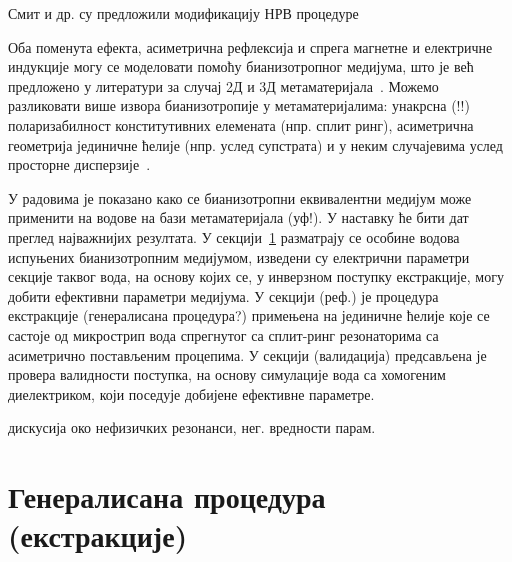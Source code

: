 Смит и др. су предложили модификацију НРВ процедуре~\cite{smith:05}

Оба поменута ефекта, асиметрична рефлексија и спрега магнетне и електричне индукције могу се моделовати помоћу бианизотропног медијума, што је већ предложено у литератури за случај 2Д и 3Д метаматеријала~\cite{chen:05,kriegler,shalaev}. Можемо разликовати више извора бианизотропије у метаматеријалима: унакрсна (!!) поларизабилност конститутивних елемената (нпр. сплит ринг), асиметрична геометрија јединичне ћелије (нпр. услед супстрата) и у неким случајевима услед просторне дисперзије~\cite{alu2}.

У радовима \cite{bian_mtt,bian_physcr} је показано како се бианизотропни еквивалентни медијум може применити на водове на бази метаматеријала (уф!). У наставку ће бити дат преглед најважнијих резултата. У секцији~\ref{sekc2} разматрају се особине водова испуњених бианизотропним медијумом, изведени су електрични параметри секције таквог вода, на основу којих се, у инверзном поступку екстракције, могу добити ефективни параметри медијума. У секцији (реф.) је процедура екстракције (генералисана процедура?) примењена на јединичне ћелије које се састоје од микрострип вода спрегнутог са сплит-ринг резонаторима са асиметрично постављеним процепима. У секцији (валидација) предсављена је провера валидности поступка, на основу симулације вода са хомогеним диелектриком, који поседује добијене ефективне параметре.

дискусија око нефизичких резонанси, нег. вредности парам.

\section{Генералисана процедура (екстракције)}\label{sekc2}
